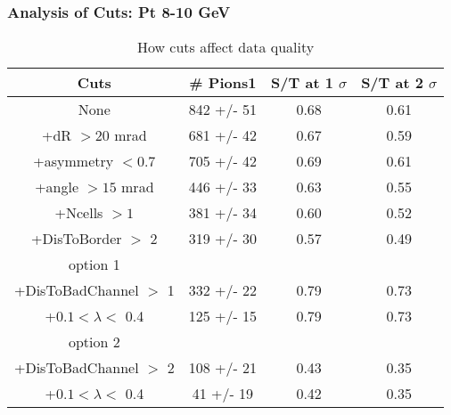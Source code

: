 \frame
{
\frametitle{Analysis of Cuts: Pt  8-10 GeV}
\begin{table}
\caption{How cuts affect data quality}
\centering
\begin{tabular}{c c c c}
\hline\hline
Cuts & \# Pions1 & S/T at 1 $\sigma$ & S/T at 2 $\sigma$ \\ [0.5ex]
\hline
None &  842 +/-   51 & 0.68 & 0.61 \\ %
+dR $> 20$ mrad &  681 +/-   42 & 0.67 & 0.59 \\ %
+asymmetry $< 0.7$ &  705 +/-   42 & 0.69 & 0.61 \\ %
+angle $> 15$ mrad &  446 +/-   33 & 0.63 & 0.55 \\ %
+Ncells $> 1$&  381 +/-   34 & 0.60 & 0.52 \\ %
+DisToBorder $>$ 2 &  319 +/-   30 & 0.57 & 0.49 \\ %
option 1\\
+DisToBadChannel $>$ 1&  332 +/-   22 & 0.79 & 0.73 \\ %
+$0.1 < \lambda <$ 0.4 &  125 +/-   15 & 0.79 & 0.73 \\ %
option 2\\
+DisToBadChannel $>$ 2&  108 +/-   21 & 0.43 & 0.35 \\ %
+$0.1 < \lambda <$ 0.4 &   41 +/-   19 & 0.42 & 0.35 \\ %
[1ex]
\hline
\end{tabular}
\label{table:nonlin}
\end{table}
}
